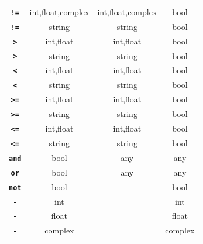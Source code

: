 \begin{center}
\begin{tabular}{c|c|c|c}
\texttt{\textbf{!=}} & int,float,complex   & int,float,complex     & bool\\
\texttt{\textbf{!=}} & string   & string     & bool\\
\texttt{\textbf{>}} & int,float   & int,float     & bool\\
\texttt{\textbf{>}} & string   & string     & bool\\
\texttt{\textbf{<}} & int,float   & int,float     & bool\\
\texttt{\textbf{<}} & string   & string     & bool\\
\texttt{\textbf{>=}} & int,float   & int,float     & bool\\
\texttt{\textbf{>=}} & string   & string     & bool\\
\texttt{\textbf{<=}}    & int,float   & int,float     & bool\\
\texttt{\textbf{<=}} & string   & string     & bool\\
\texttt{\textbf{and}} & bool & any & any\\
\texttt{\textbf{or}}   & bool & any & any\\
\texttt{\textbf{not}}    & bool &      & bool\\
\texttt{\textbf{-}}    & int &    & int\\
\texttt{\textbf{-}}    & float &    & float\\
\texttt{\textbf{-}}    & complex &    & complex

\end{tabular}
\end{center}

